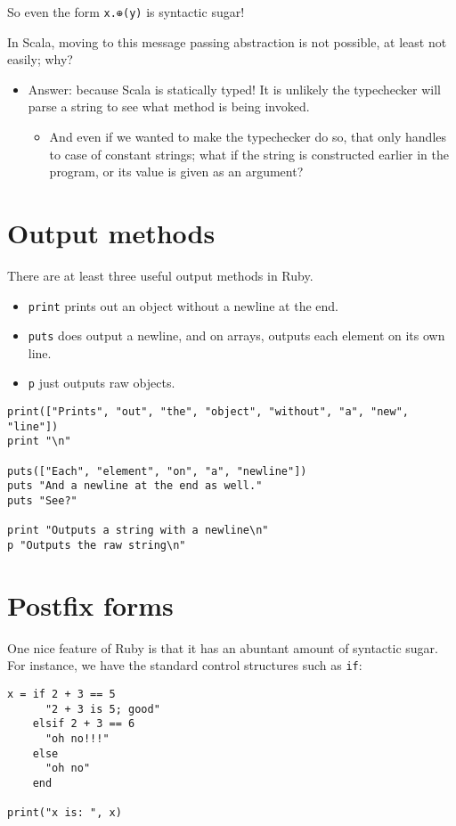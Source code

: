 \documentclass[11pt]{article}
\begin{document}
So even the form \texttt{x.⊕(y)} is syntactic sugar!

In Scala, moving to this message passing abstraction
is not possible, at least not easily; why?
\begin{itemize}
\item Answer: because Scala is statically typed!
It is unlikely the typechecker will parse a string
to see what method is being invoked.
\begin{itemize}
\item And even if we wanted to make the typechecker do so,
that only handles to case of constant strings;
what if the string is constructed earlier in the program,
or its value is given as an argument?
\end{itemize}
\end{itemize}

\section{Output methods}
\label{sec:orga48128e}
There are at least three useful output methods in Ruby.
\begin{itemize}
\item \texttt{print} prints out an object without a newline at the end.
\item \texttt{puts} does output a newline, and on arrays, outputs each element
on its own line.
\item \texttt{p} just outputs raw objects.
\end{itemize}
\begin{verbatim}
print(["Prints", "out", "the", "object", "without", "a", "new", "line"])
print "\n"

puts(["Each", "element", "on", "a", "newline"])
puts "And a newline at the end as well."
puts "See?"

print "Outputs a string with a newline\n"
p "Outputs the raw string\n"
\end{verbatim}

\section{Postfix forms}
\label{sec:org2d869bc}
One nice feature of Ruby is that it has
an abuntant amount of syntactic sugar.
For instance, we have the standard control structures
such as \texttt{if}:
\begin{verbatim}
x = if 2 + 3 == 5
      "2 + 3 is 5; good"
    elsif 2 + 3 == 6
      "oh no!!!"
    else
      "oh no"
    end

print("x is: ", x)
\end{verbatim}
\end{document}
